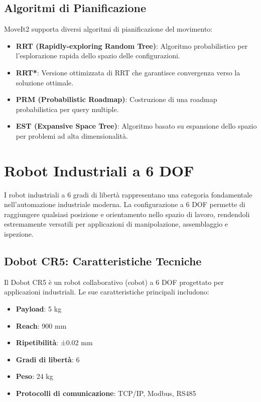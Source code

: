 \documentclass[12pt,a4paper,twoside,openright]{book}
\begin{document}
\subsection{Algoritmi di Pianificazione}

MoveIt2 supporta diversi algoritmi di pianificazione del movimento:

\begin{itemize}
    \item \textbf{RRT (Rapidly-exploring Random Tree)}: Algoritmo probabilistico per l'esplorazione rapida dello spazio delle configurazioni.
    \item \textbf{RRT*}: Versione ottimizzata di RRT che garantisce convergenza verso la soluzione ottimale.
    \item \textbf{PRM (Probabilistic Roadmap)}: Costruzione di una roadmap probabilistica per query multiple.
    \item \textbf{EST (Expansive Space Tree)}: Algoritmo basato su espansione dello spazio per problemi ad alta dimensionalità.
\end{itemize}

\section{Robot Industriali a 6 DOF}

I robot industriali a 6 gradi di libertà rappresentano una categoria fondamentale nell'automazione industriale moderna. La configurazione a 6 DOF permette di raggiungere qualsiasi posizione e orientamento nello spazio di lavoro, rendendoli estremamente versatili per applicazioni di manipolazione, assemblaggio e ispezione.

\subsection{Dobot CR5: Caratteristiche Tecniche}

Il Dobot CR5 è un robot collaborativo (cobot) a 6 DOF progettato per applicazioni industriali. Le sue caratteristiche principali includono:

\begin{itemize}
    \item \textbf{Payload}: 5 kg
    \item \textbf{Reach}: 900 mm
    \item \textbf{Ripetibilità}: ±0.02 mm
    \item \textbf{Gradi di libertà}: 6
    \item \textbf{Peso}: 24 kg
    \item \textbf{Protocolli di comunicazione}: TCP/IP, Modbus, RS485
\end{itemize}
\end{document}

